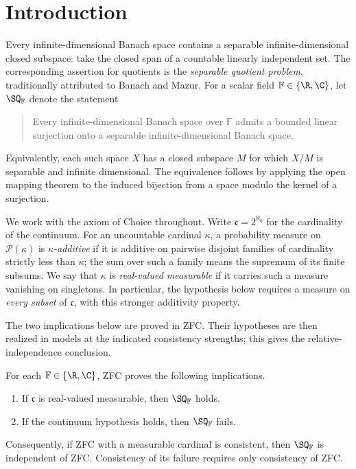 \section{Introduction}\label{sec:introduction}

Every infinite-dimensional Banach space contains a separable
infinite-dimensional closed subspace: take the closed span of a countable
linearly independent set. The corresponding assertion for quotients is the
\emph{separable quotient problem}, traditionally attributed to Banach and
Mazur. For a scalar field $\mathbb F\in\{\R,\C\}$, let $\SQ_{\mathbb F}$
denote the statement
\begin{quote}
Every infinite-dimensional Banach space over $\mathbb F$ admits a
bounded linear surjection onto a separable infinite-dimensional
Banach space.
\end{quote}
Equivalently, each such space $X$ has a closed subspace $M$ for which
$X/M$ is separable and infinite dimensional. The equivalence follows by
applying the open mapping theorem to the induced bijection from a space
modulo the kernel of a surjection.

We work with the axiom of Choice throughout. Write
$\mathfrak c=2^{\aleph_0}$ for the cardinality of the continuum.
For an uncountable cardinal $\kappa$, a probability measure on
$\mathcal P(\kappa)$ is \emph{$\kappa$-additive} if it is additive on
pairwise disjoint families of cardinality strictly less than $\kappa$;
the sum over such a family means the supremum of its finite subsums.
We say that $\kappa$ is \emph{real-valued measurable} if it carries such
a measure vanishing on singletons. In particular, the hypothesis below
requires a measure on \emph{every subset} of $\mathfrak c$, with this
stronger additivity property.

The two implications below are proved in ZFC. Their hypotheses are then
realized in models at the indicated consistency strengths; this gives
the relative-independence conclusion.

\begin{theorem}\label{intro:main}
For each $\mathbb F\in\{\R,\C\}$, ZFC proves the following implications.
\begin{enumerate}[label=\textup{(\roman*)}]
 \item If $\mathfrak c$ is real-valued measurable, then $\SQ_{\mathbb F}$
 holds.
 \item If the continuum hypothesis holds, then $\SQ_{\mathbb F}$ fails.
\end{enumerate}
Consequently, if ZFC with a measurable cardinal is consistent, then
$\SQ_{\mathbb F}$ is independent of ZFC. Consistency of its failure
requires only consistency of ZFC.
\end{theorem}

